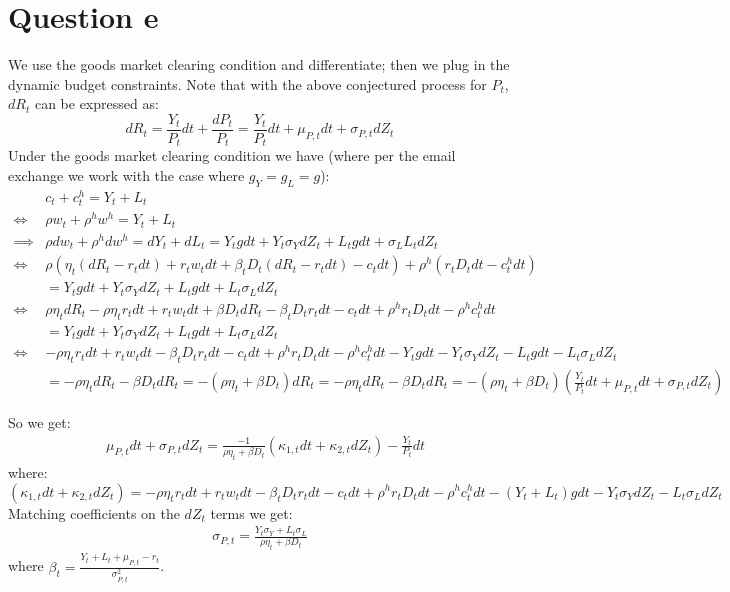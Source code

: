 \documentclass{article}
\begin{document}
\section*{Question e}
We use the goods market clearing condition and differentiate; then we plug in the dynamic budget constraints. Note that with the above conjectured process for $P_t$,
$dR_t$ can be expressed as:
\[
    d R_t = \frac{Y_t}{P_t} d t + \frac{d P_t}{P_t} =  \frac{Y_t}{P_t} d t + \mu_{P, t} d t+\sigma_{P, t} d Z_{t}  
\]
Under the goods market clearing condition we have (where per the email exchange we work with the case where $g_Y = g_L = g$):
\[
    \begin{aligned}
        &c_t + c_t^h = Y_t + L_t\\
        \iff & \rho w_t + \rho^h w^h = Y_t + L_t\\
        \implies & \rho d w_t + \rho^h d w^h = d Y_t + d L_t  = Y_t g d t + Y_t \sigma_Y d Z_t + L_t g d t + \sigma_L L_t d Z_t\\ %
        \iff &\rho (\eta_t  (d R_t - r_t d t)  + r_t w_t d t + \beta_t D_t (d R_t - r_t d t)  - c_t d t) + \rho^h(r_t D_t d t  - c_t^h d t)\\
        &= Y_t g d t + Y_t \sigma_Y d Z_t + L_t g d t + L_t \sigma_L d Z_t\\
        \iff & \rho \eta_t d R_t - \rho \eta_t r_t d t + r_t w_t d t + \beta D_t d R_t  - \beta_t D_t r_t d t - c_t d t + \rho^h  r_t D_t d t - \rho^h c_t^h d t\\
        &= Y_t g d t + Y_t \sigma_Y d Z_t + L_t g d t + L_t \sigma_L d Z_t\\
        \iff & - \rho \eta_t r_t d t + r_t w_t d t   - \beta_t D_t r_t d t - c_t d t + \rho^h  r_t D_t d t - \rho^h c_t^h d t - Y_t g d t - Y_t \sigma_Y d Z_t - L_t g d t - L_t \sigma_L d Z_t\\
        &= -\rho \eta_t d R_t - \beta D_t d R_t = -(\rho \eta_t + \beta D_t) d R_t = -\rho \eta_t d R_t - \beta D_t d R_t = -(\rho \eta_t + \beta D_t) (\frac{Y_t}{P_t} d t + \mu_{P, t} d t+\sigma_{P, t} d Z_{t})
    \end{aligned}\]
    
    So we get:
    \[
    \begin{aligned}
        &\mu_{P, t} d t + \sigma_{P, t } d Z_t =  \frac{-1}{\rho \eta_t + \beta D_t}(\kappa_{1,t} d t + \kappa_{2,t} d Z_t) - \frac{Y_t}{P_t} d t  
    \end{aligned}
    \]
    where:
    \[
    (\kappa_{1,t} d t + \kappa_{2,t} d Z_t) = - \rho \eta_t r_t d t + r_t w_t d t   - \beta_t D_t r_t d t - c_t d t + \rho^h  r_t D_t d t - \rho^h c_t^h d t - (Y_t + L_t) g d t  - Y_t \sigma_Y d Z_t- L_t \sigma_L d Z_t    
    \]
    Matching coefficients on the $dZ_t$ terms we get:
\[
    \begin{aligned}
        \sigma_{P, t}  = \frac{Y_t \sigma_Y + L_t \sigma_L}{\rho \eta_t + \beta D_t}
    \end{aligned}
\]
where $\beta_t = \frac{Y_t + L_t + \mu_{P, t} - r_t}{\sigma_{P, t}^2}$.
\end{document}
